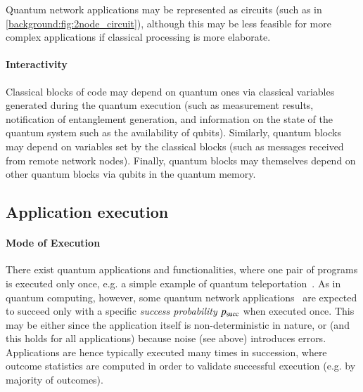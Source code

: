 Quantum network applications may be represented as circuits (such as in \cref{background:fig:2node_circuit}), although this may be less feasible for more complex applications if classical processing is more elaborate.


\paragraph{Interactivity}
Classical blocks of code may depend on quantum ones via classical variables generated during the quantum execution (such as measurement results, notification of entanglement generation, and information on the state of the quantum system such as the availability of qubits).
Similarly, quantum blocks may depend on variables set by the classical blocks (such as messages received from remote network nodes).
Finally, quantum blocks may themselves depend on other quantum blocks via qubits in the quantum memory. 





\subsection{Application execution}

\paragraph{Mode of Execution}
There exist quantum applications and functionalities, where one pair of programs is executed only once, e.g. a simple example of quantum teleportation~\cite{bennett_1993_teleportation}.
As in quantum computing, however, some quantum network applications~\cite{wehner_2018_stages} are expected to succeed only with a specific \emph{success probability} $p_{\rm succ}$ when executed once.
This may be either since the application itself is non-deterministic in nature, or (and this holds for all applications) because noise (see above) introduces errors.
Applications are hence typically executed many times in succession, where outcome statistics are computed in order to validate successful execution (e.g. by majority of outcomes).

